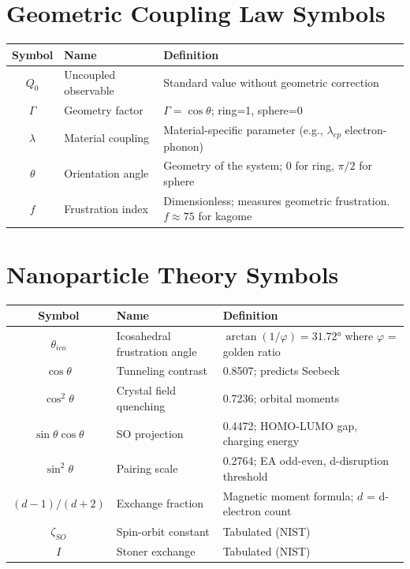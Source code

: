 \documentclass[11pt, a4paper]{article}
\begin{document}
\section{Geometric Coupling Law Symbols}

\begin{center}
\begin{longtable}{@{}clp{7cm}@{}}
\toprule
\textbf{Symbol} & \textbf{Name} & \textbf{Definition} \\
\midrule
\endhead
$Q_0$ & Uncoupled observable & Standard value without
  geometric correction \\
$\Gamma$ & Geometry factor & $\Gamma = \cos\theta$; ring=1,
  sphere=0 \\
$\lambda$ & Material coupling & Material-specific parameter
  (e.g., $\lambda_{ep}$ electron-phonon) \\
$\theta$ & Orientation angle & Geometry of the system; 0 for
  ring, $\pi/2$ for sphere \\
$f$ & Frustration index & Dimensionless; measures geometric
  frustration. $f \approx 75$ for kagome \\
\bottomrule
\end{longtable}
\end{center}

\section{Nanoparticle Theory Symbols}

\begin{center}
\begin{longtable}{@{}clp{7cm}@{}}
\toprule
\textbf{Symbol} & \textbf{Name} & \textbf{Definition} \\
\midrule
\endhead
$\theta_{ico}$ & Icosahedral frustration angle &
  $\arctan(1/\varphi) = 31.72°$ where $\varphi$ = golden ratio \\
$\cos\theta$ & Tunneling contrast & 0.8507; predicts Seebeck \\
$\cos^2\theta$ & Crystal field quenching & 0.7236; orbital moments \\
$\sin\theta\cos\theta$ & SO projection & 0.4472; HOMO-LUMO gap,
  charging energy \\
$\sin^2\theta$ & Pairing scale & 0.2764; EA odd-even, d-disruption
  threshold \\
$(d-1)/(d+2)$ & Exchange fraction & Magnetic moment formula;
  $d$ = d-electron count \\
$\zeta_{SO}$ & Spin-orbit constant & Tabulated (NIST) \\
$I$ & Stoner exchange & Tabulated (NIST) \\
\bottomrule
\end{longtable}
\end{center}
\end{document}
